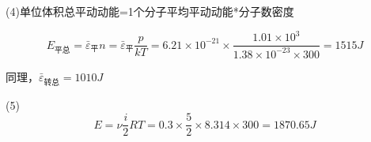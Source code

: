 (4)单位体积总平动动能=1个分子平均平动动能*分子数密度

$$E_{\mbox{平总}}=\bar { \varepsilon } _ {\mbox{平}}n=\bar { \varepsilon } _ {\mbox{平}}\frac{p}{kT}=6.21 \times 10 ^ { - 21 } \times \frac { 1.01 \times 10 ^ { 3 } } { 1.38 \times 10 ^ { - 23 } \times 300 } = 1515 J$$

同理，$\bar { \varepsilon } _ {\mbox{转总}}=1010J$

(5)
$$
E = \nu \frac { i } { 2 } R T = 0.3 \times \frac { 5 } { 2 } \times 8.314 \times 300 = 1870.65 J
$$